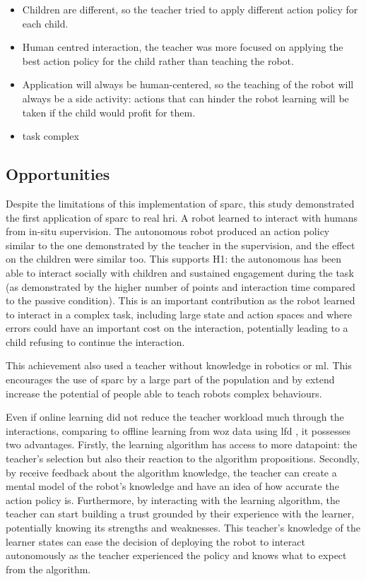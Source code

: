 \begin{itemize}
	\item Children are different, so the teacher tried to apply different action policy for each child.
	\item Human centred interaction, the teacher was more focused on applying the best action policy for the child rather than teaching the robot.
	\item Application will always be human-centered, so the teaching of the robot will always be a side activity: actions that can hinder the robot learning will be taken if the child would profit for them.
	\item task complex
\end{itemize}

\subsection{Opportunities}

Despite the limitations of this implementation of \gls{sparc}, this study demonstrated the first application of \gls{sparc} to real \gls{hri}. A robot learned to interact with humans from in-situ supervision.  The autonomous robot produced an action policy similar to the one demonstrated by the teacher in the supervision, and the effect on the children were similar too. This supports H1: the autonomous has been able to interact socially with children and sustained engagement during the task (as demonstrated by the higher number of points and interaction time compared to the passive condition). This is an important contribution as the robot learned to interact in a complex task, including large state and action spaces and where errors could have an important cost on the interaction, potentially leading to a child refusing to continue the interaction.

This achievement also used a teacher without knowledge in robotics or \gls{ml}. This encourages the use of \gls{sparc} by a large part of the population and by extend increase the potential of people able to teach robots complex behaviours. 

Even if online learning did not reduce the teacher workload much through the interactions, comparing to offline learning from \gls{woz} data using \gls{lfd} \citep{sequeira2016discovering,liu2014train}, it possesses two advantages. Firstly, the learning algorithm has access to more datapoint: the teacher's selection but also their reaction to the algorithm propositions. Secondly, by receive feedback about the algorithm knowledge, the teacher can create a mental model of the robot's knowledge and have an idea of how accurate the action policy is. Furthermore, by interacting with the learning algorithm, the teacher can start building a trust grounded by their experience with the learner, potentially knowing its strengths and weaknesses. This teacher's knowledge of the learner states can ease the decision of deploying the robot to interact autonomously as the teacher experienced the policy and knows what to expect from the algorithm.

